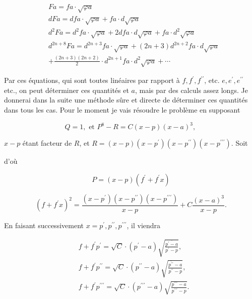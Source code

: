 \documentclass{article}
\begin{document}
\[
\begin{aligned}
& F a=f a \cdot \sqrt{\varphi a} \\
& d F a=d f a \cdot \sqrt{\varphi a}+f a \cdot d \sqrt{\varphi a} \\
& d^{2} F a=d^{2} f a \cdot \sqrt{\varphi a}+2 d f a \cdot d \sqrt{\varphi a}+f a \cdot d^{2} \sqrt{\varphi a} \\
& d^{2 n+8} F a=d^{2 n+3} f a \cdot \sqrt{\varphi a}+(2 n+3) d^{2 n+2} f a \cdot d \sqrt{\varphi a} \\
& +\frac{(2 n+3)(2 n+2)}{2} \cdot d^{2 n+1} f a \cdot d^{2} \sqrt{\varphi a}+\cdots
\end{aligned}
\]

Par ces équations, qui sont toutes linéaires par rapport à \(f, f^{\prime}, f^{\prime \prime}\), etc. \(e, e^{\prime}, e^{\prime \prime}\) etc., on peut déterminer ces quantités et \(a\), mais par des calculs assez longs. Je donnerai dans la suite une méthode sûre et directe de déterminer ces quantités dans tous les cas. Pour le moment je vais résoudre le problème en supposant

\[
Q=1, \text { et } P^{8}-R=C(x-p)(x-a)^{3} \text {, }
\]

\(x-p\) étant facteur de \(R\), et \(R=(x-p)\left(x-p^{\prime}\right)\left(x-p^{\prime \prime}\right)\left(x-p^{\prime \prime \prime}\right)\). Soit

d'où

\[
P=(x-p)\left(f^{\prime}+f^{\prime} x\right)
\]

\[
\left(f+f^{\prime} x\right)^{2}=\frac{\left(x-p^{\prime}\right)\left(x-p^{\prime \prime}\right)\left(x-p^{\prime \prime \prime}\right)}{x-p}+C \frac{(x-a)^{3}}{x-p} .
\]

En faisant successivement \(x=p^{\prime}, p^{\prime \prime}, p^{\prime \prime \prime}\), il viendra

\[
\begin{aligned}
& f+f^{\prime} p^{\prime}=\sqrt{C} \cdot\left(p^{\prime}-a\right) \sqrt{\frac{\overline{p^{\prime}-a}}{p^{\prime}-p}}, \\
& f+f^{\prime} p^{\prime \prime}=\sqrt{C} \cdot\left(p^{\prime \prime}-a\right) \sqrt{\frac{\overline{p^{\prime \prime}}-a}{p^{\prime \prime}-p}}, \\
& f+f^{\prime} p^{\prime \prime \prime}=\sqrt{C} \cdot\left(p^{\prime \prime \prime}-a\right) \sqrt{\frac{p^{\prime \prime \prime}-a}{p^{\prime \prime \prime}-p}} .
\end{aligned}
\]
\end{document}
